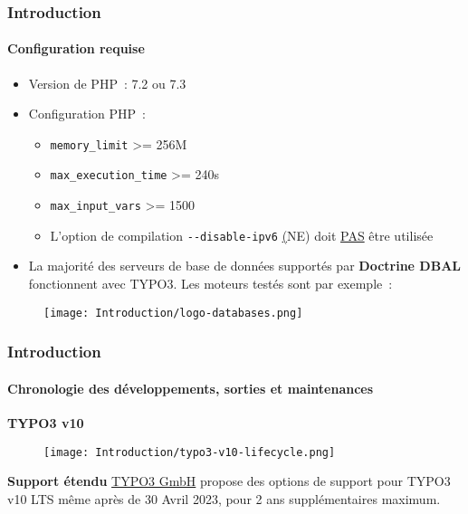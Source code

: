
\begin{frame}[fragile]
	\frametitle{Introduction}
	\framesubtitle{Configuration requise}

	\begin{itemize}
		\item Version de PHP~: 7.2 ou 7.3
		\item Configuration PHP~:

			\begin{itemize}
				\item \texttt{memory\_limit} >= 256M
				\item \texttt{max\_execution\_time} >= 240s
				\item \texttt{max\_input\_vars} >= 1500
				\item L'option de compilation \texttt{-}\texttt{-disable-ipv6}
					\underline(NE) doit \underline{PAS} être utilisée
			\end{itemize}

		\item La majorité des serveurs de base de données supportés par \textbf{Doctrine DBAL}
			fonctionnent avec TYPO3. Les moteurs testés sont par exemple~:
	\end{itemize}

	\begin{figure}
		\texttt{[image: Introduction/logo-databases.png]}
	\end{figure}

\end{frame}


\begin{frame}[fragile]
	\frametitle{Introduction}
	\framesubtitle{Chronologie des développements, sorties et maintenances}

	\textbf{TYPO3 v10}

	\begin{figure}
		\texttt{[image: Introduction/typo3-v10-lifecycle.png]}
	\end{figure}

	\textbf{Support étendu}\newline
	\smaller
		\href{https://typo3.com}{TYPO3 GmbH} propose des options de support pour TYPO3
		v10 LTS même après de 30 Avril 2023, pour 2 ans supplémentaires maximum.
	\normalsize

\end{frame}

